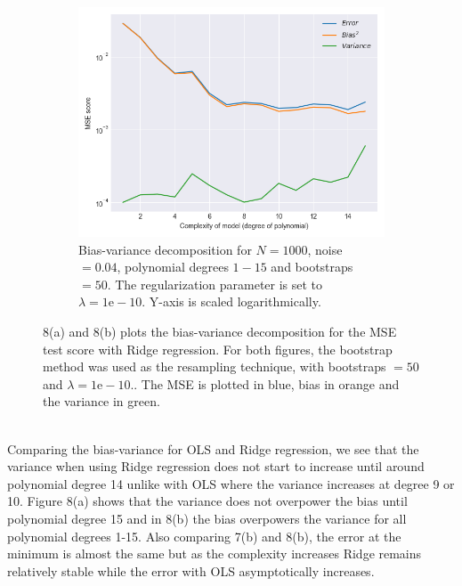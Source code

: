 \documentclass[a4paper,twocolumn]{article}
\begin{document}
\begin{figure}[ht]
    \begin{subfigure}[b]{0.9\columnwidth}
        \includegraphics[width=\columnwidth]{bias_variance_tradeoff_Lambda=1e-10_Bootstraps=50_N=1000_Noise=0.04_Degree=1-15.png}
        \caption{Bias-variance decomposition for $N = 1000$, noise $= 0.04$, polynomial degrees $1- 15$ and bootstraps $= 50$. The regularization parameter is set to $\lambda = 1\textrm{e}-10$. Y-axis is scaled logarithmically.}
    \end{subfigure}
    \caption{8(a) and 8(b) plots the bias-variance decomposition for the MSE test score with Ridge regression. For both figures, the bootstrap method was used as the resampling technique, with bootstraps $= 50$ and $\lambda = 1\textrm{e}-10$.. The MSE is plotted in blue, bias in orange and the variance in green. }
\end{figure}\\
Comparing the bias-variance for OLS and Ridge regression, we see that the variance when using Ridge regression does not start to increase until around polynomial degree 14 unlike with OLS where the variance increases at degree 9 or 10. Figure 8(a) shows that the variance does not overpower the bias until polynomial degree 15 and in 8(b) the bias overpowers the variance for all polynomial degrees 1-15. Also comparing 7(b) and 8(b), the error at the minimum is almost the same but as the complexity increases Ridge remains relatively stable while the error with OLS asymptotically increases.
\end{document}
